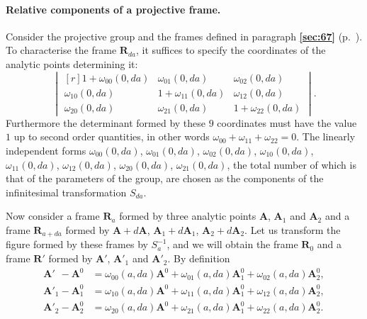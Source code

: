 \documentclass[leqno,11pt]{book}
\numberwithin{equation}{chapter}
\theoremstyle{shape1}
\theoremstyle{shapesmall}
\newcommand{\fsref}[1]{{\rm\textsection\textbf{\ref{sec:#1}}}}
\begin{document}
\paragraph{Relative components of a projective frame.}
\label{sec:73}
Consider the projective group and the frames defined in paragraph \fsref{67} (p.~\pageref{sec:67}). To characterise the frame $\mathbf{R}_{da}$, it suffices to specify the coordinates of the analytic points determining it:
\[
\begin{vmatrix*}[r]
  1+\omega_{00}(0,da)&\omega_{01}(0,da)&\omega_{02}(0,da)\\
  \omega_{10}(0,da)&1+\omega_{11}(0,da)&\omega_{12}(0,da)\\
  \omega_{20}(0,da)&\omega_{21}(0,da)&1+\omega_{22}(0,da)
\end{vmatrix*}.
\]
Furthermore the determinant formed by these $9$ coordinates must have the value $1$ up to second order quantities, in other words $\omega_{00}+\omega_{11}+\omega_{22}=0$. The linearly independent forms $\omega_{00}(0,da)$, $\omega_{01}(0,da)$, $\omega_{02}(0,da)$, $\omega_{10}(0,da)$, $\omega_{11}(0,da)$, $\omega_{12}(0,da)$, $\omega_{20}(0,da)$, $\omega_{21}(0,da)$, the total number of which is that of the parameters of the group, are chosen as the components of the infinitesimal transformation $S_{da}$.

Now consider a frame $\mathbf{R}_{a}$ formed by three analytic points $\mathbf{A}$, $\mathbf{A}_{1}$ and $\mathbf{A}_{2}$ and a frame $\mathbf{R}_{a+da}$ formed by $\mathbf{A}+d\mathbf{A}$, $\mathbf{A}_{1}+d\mathbf{A}_{1}$, $\mathbf{A}_{2}+d\mathbf{A}_{2}$. Let us transform the figure formed by these frames by $S_{a}^{-1}$, and we will obtain the frame $\mathbf{R}_{0}$ and a frame $\mathbf{R}'$ formed by $\mathbf{A}'$, $\mathbf{A}'_{1}$ and $\mathbf{A}'_{2}$. By definition
\begin{align*}
  \mathbf{A}'_{\phantom{0}}-\mathbf{A}^{0}&=\omega_{00}(a,da)\mathbf{A}^{0}+\omega_{01}(a,da)\mathbf{A}^{0}_{1}+\omega_{02}(a,da)\mathbf{A}^{0}_{2},\\
  \mathbf{A}'_{1}-\mathbf{A}^{0}_{1}&=\omega_{10}(a,da)\mathbf{A}^{0}+\omega_{11}(a,da)\mathbf{A}^{0}_{1}+\omega_{12}(a,da)\mathbf{A}^{0}_{2},\\
  \mathbf{A}'_{2}-\mathbf{A}^{0}_{2}&=\omega_{20}(a,da)\mathbf{A}^{0}+\omega_{21}(a,da)\mathbf{A}^{0}_{1}+\omega_{22}(a,da)\mathbf{A}^{0}_{2}.
\end{align*}
\end{document}
